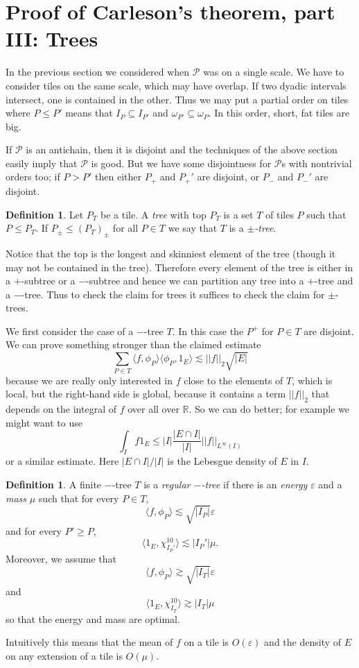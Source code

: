 \documentclass[12pt]{report}
\newcommand{\RR}{\mathbb{R}}
\newcommand{\dfn}[1]{\emph{#1}\index{#1}}
\theoremstyle{definition}
\newtheorem{definition}[theorem]{Definition}
\begin{document}
\section{Proof of Carleson's theorem, part III: Trees}
In the previous section we considered when $\mathcal P$ was on a single scale. We have to consider tiles on the same scale, which may have overlap.
If two dyadic intervals intersect, one is contained in the other. Thus we may put a partial order on tiles where $P \leq P'$ means that $I_P \subseteq I_{P'}$ and $\omega_{P'} \subseteq \omega_P$.
In this order, short, fat tiles are big.

If $\mathcal P$ is an antichain, then it is disjoint and the techniques of the above section easily imply that $\mathcal P$ is good.
But we have some disjointness for $\mathcal P$s with nontrivial orders too; if $P > P'$ then either $P_+$ and $P_+'$ are disjoint, or $P_-$ and $P_-'$ are disjoint.
\begin{definition}
Let $P_T$ be a tile. A \dfn{tree} with top $P_T$ is a set $T$ of tiles $P$ such that $P \leq P_T$. If $P_\pm \leq (P_T)_\pm$ for all $P \in T$ we say that $T$ is a \dfn{$\pm$-tree}.
\end{definition}
Notice that the top is the longest and skinniest element of the tree (though it may not be contained in the tree). Therefore every element of the tree is either in a $+$-subtree or a $-$-subtree and hence we can partition any tree into a $+$-tree and a $-$-tree.
Thus to check the claim for trees it suffices to check the claim for $\pm$-trees.

We first consider the case of a $-$-tree $T$. In this case the $P^+$ for $P \in T$ are disjoint.
We can prove something stronger than the claimed estimate
$$\sum_{P \in T} \langle f, \phi_P\rangle \langle \phi_P, 1_E\rangle \lesssim ||f||_2\sqrt{|E|}$$
because we are really only interested in $f$ close to the elements of $T$, which is local, but the right-hand side is global, because it contains a term $||f||_2$ that depends on the integral of $f$ over all over $\RR$.
So we can do better; for example we might want to use
$$\int_I f1_E \leq |I|\frac{|E \cap I|}{|I|} ||f||_{L^\infty(I)}$$
or a similar estimate. Here $|E \cap I|/|I|$ is the Lebesgue density of $E$ in $I$.

\begin{definition}
A finite $-$-tree $T$ is a \dfn{regular $-$-tree} if there is an \dfn{energy} $\varepsilon$ and a \dfn{mass} $\mu$ such that for every $P \in T$,
$$\langle f, \phi_P\rangle \lesssim \sqrt{|I_P|}\varepsilon$$
and for every $P' \geq P$,
$$\langle 1_E, \chi_{I_P'}^{10}\rangle \lesssim |I_P'| \mu.$$
Moreover, we assume that
$$\langle f, \phi_P\rangle \gtrsim \sqrt{|I_T|}\varepsilon$$
and
$$\langle 1_E, \chi_{I_T}^{10}\rangle \gtrsim |I_T|\mu$$
so that the energy and mass are optimal.
\end{definition}
Intuitively this means that the mean of $f$ on a tile is $O(\varepsilon)$ and the density of $E$ on any extension of a tile is $O(\mu)$.
\end{document}
